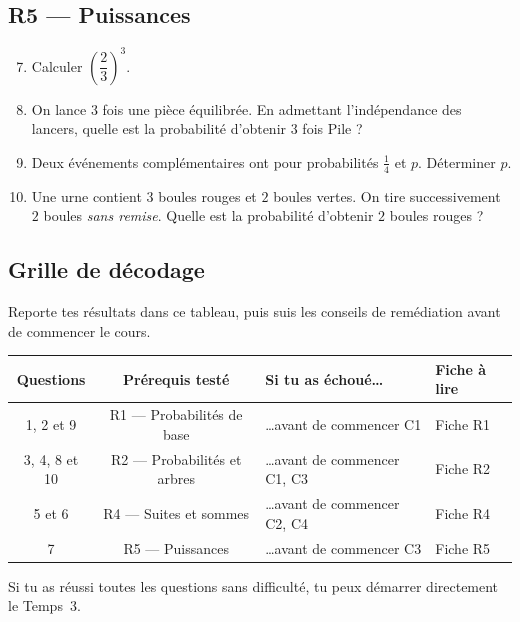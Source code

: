 \subsection*{R5 — Puissances}

\begin{enumerate}
  \setcounter{enumi}{6}

  \item Calculer $\left(\dfrac{2}{3}\right)^3$.

  \item On lance $3$ fois une pièce équilibrée. En admettant l'indépendance des lancers, quelle est la probabilité d'obtenir $3$ fois Pile ?

  \item Deux événements complémentaires ont pour probabilités $\frac{1}{4}$ et $p$. Déterminer $p$.

  \item Une urne contient $3$ boules rouges et $2$ boules vertes. On tire successivement $2$ boules \emph{sans remise}. Quelle est la probabilité d'obtenir $2$ boules rouges ?

\end{enumerate}

\bigskip

\subsection*{Grille de décodage}

Reporte tes résultats dans ce tableau, puis suis les conseils de remédiation avant de commencer le cours.

\begin{center}
\begin{tabular}{|c|c|l|l|}
\hline
\textbf{Questions} & \textbf{Prérequis testé} & \textbf{Si tu as échoué\ldots} & \textbf{Fiche à lire} \\
\hline
1, 2 et 9 & R1 — Probabilités de base & \ldots avant de commencer C1 & Fiche R1 \\
\hline
3, 4, 8 et 10 & R2 — Probabilités et arbres & \ldots avant de commencer C1, C3 & Fiche R2 \\
\hline
5 et 6 & R4 — Suites et sommes & \ldots avant de commencer C2, C4 & Fiche R4 \\
\hline
7 & R5 — Puissances & \ldots avant de commencer C3 & Fiche R5 \\
\hline
\end{tabular}
\end{center}

\bigskip

Si tu as réussi toutes les questions sans difficulté, tu peux démarrer directement le Temps~3.
